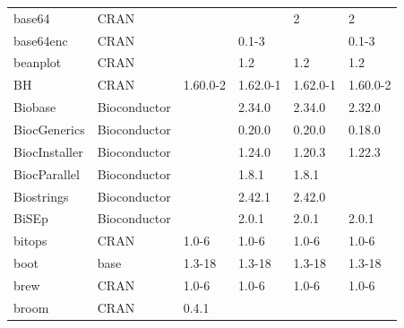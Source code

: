 \begin{longtable}{llllll}
\rowcolor{black!5}
base64                        & CRAN                      &             &             & 2              & 2                  \\
\rowcolor{black!10}
base64enc                     & CRAN                      &             & 0.1-3       &                & 0.1-3             \\
\rowcolor{black!5}
beanplot                      & CRAN                      &             & 1.2         & 1.2            & 1.2                \\
\rowcolor{black!10}
BH                            & CRAN                      & 1.60.0-2    & 1.62.0-1    & 1.62.0-1       & 1.60.0-2          \\
\rowcolor{black!5}
Biobase                       & Bioconductor              &             & 2.34.0      & 2.34.0         & 2.32.0             \\
\rowcolor{black!10}
BiocGenerics                  & Bioconductor              &             & 0.20.0      & 0.20.0         & 0.18.0            \\
\rowcolor{black!5}
BiocInstaller                 & Bioconductor              &             & 1.24.0      & 1.20.3         & 1.22.3             \\
\rowcolor{black!10}
BiocParallel                  & Bioconductor              &             & 1.8.1       & 1.8.1          &                   \\
\rowcolor{black!5}
Biostrings                    & Bioconductor              &             & 2.42.1      & 2.42.0         &                    \\
\rowcolor{black!10}
BiSEp                         & Bioconductor              &             & 2.0.1       & 2.0.1          & 2.0.1             \\
\rowcolor{black!5}
bitops                        & CRAN                      & 1.0-6       & 1.0-6       & 1.0-6          & 1.0-6              \\
\rowcolor{black!10}
boot                          & base                      & 1.3-18      & 1.3-18      & 1.3-18         & 1.3-18            \\
\rowcolor{black!5}
brew                          & CRAN                      & 1.0-6       & 1.0-6       & 1.0-6          & 1.0-6              \\
\rowcolor{black!10}
broom                         & CRAN                      & 0.4.1       &             &                &                   \\

\end{longtable}
